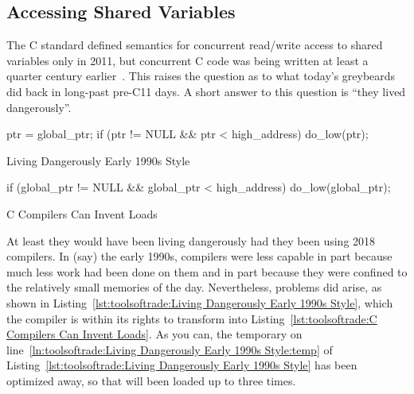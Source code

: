 \subsection{Accessing Shared Variables}
\label{sec:toolsoftrade:Accessing Shared Variables}

The C standard defined semantics for concurrent read/write access to
shared variables only in 2011, but concurrent C code was being
written at least a quarter century earlier~\cite{Beck85,Inman85}.
This raises the question as to what today's greybeards did back
in long-past pre-C11 days.
A short answer to this question is ``they lived dangerously''.

\begin{listing}[tbp]
\begin{linelabel}
\begin{VerbatimL}[commandchars=\\\{\}]
ptr = global_ptr;
if (ptr != NULL && ptr < high_address)
	do_low(ptr);
\end{VerbatimL}
\end{linelabel}
\caption{Living Dangerously Early 1990s Style}
\label{lst:toolsoftrade:Living Dangerously Early 1990s Style}
\end{listing}

\begin{listing}[tbp]
\begin{linelabel}
\begin{VerbatimL}[commandchars=\\\{\}]
if (global_ptr != NULL &&
    global_ptr < high_address)
	do_low(global_ptr);
\end{VerbatimL}
\end{linelabel}
\caption{C Compilers Can Invent Loads}
\label{lst:toolsoftrade:C Compilers Can Invent Loads}
\end{listing}

At least they would have been living dangerously had they been using
2018 compilers.
In (say) the early 1990s, compilers were less capable in part because
much less work had been done on them and in part because they were
confined to the relatively small memories of the day.
Nevertheless, problems did arise, as shown in
Listing~\ref{lst:toolsoftrade:Living Dangerously Early 1990s Style},
which the compiler is within its rights to transform into
Listing~\ref{lst:toolsoftrade:C Compilers Can Invent Loads}.
As you can, the temporary on
line~\ref{ln:toolsoftrade:Living Dangerously Early 1990s Style:temp} of
Listing~\ref{lst:toolsoftrade:Living Dangerously Early 1990s Style}
has been optimized away, so that  will been loaded
up to three times.

